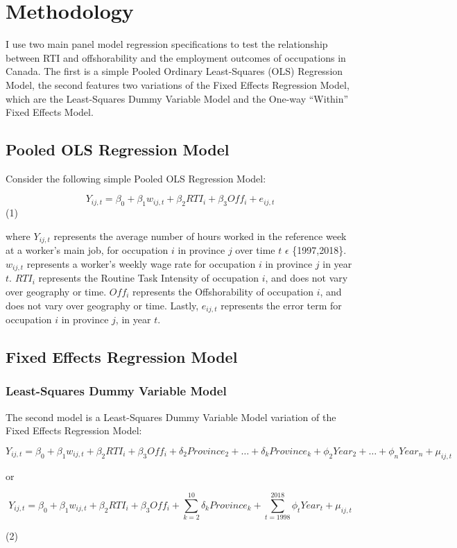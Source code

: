 \documentclass[undefended]{bumrp}
\begin{document}
\chapter{Methodology}

I use two main panel model regression specifications to test the relationship between RTI and offshorability and the employment outcomes of occupations in Canada. The first is a simple Pooled Ordinary Least-Squares (OLS) Regression Model, the second features two variations of the Fixed Effects Regression Model, which are the Least-Squares Dummy Variable Model and the One-way “Within” Fixed Effects Model.

\section{Pooled OLS Regression Model}

Consider the following simple Pooled OLS Regression Model:

\begin{center}
$$ Y_{ij,t} = \beta_{0} + \beta_{1} w_{ij,t} + \beta_{2} RTI_{i} + \beta_{3} Off_{i} + e_{ij,t} $$ (1)
\end{center}

where $Y_{ij,t}$ represents the average number of hours worked in the reference week at a worker’s main job, for occupation $i$ in province $j$ over time $t$ $\epsilon$ \{1997,2018\}.  $w_{ij,t}$ represents a worker’s weekly wage rate for occupation $i$ in province $j$ in year $t$.  $RTI_{i}$ represents the Routine Task Intensity of occupation $i$, and does not vary over geography or time.  $Off_{i}$ represents the Offshorability of occupation $i$, and does not vary over geography or time.  Lastly,  $e_{ij,t}$ represents the error term for occupation $i$ in province $j$,  in year $t$.

\section{Fixed Effects Regression Model}

\subsection{Least-Squares Dummy Variable Model}

The second model is a Least-Squares Dummy Variable Model variation of the Fixed Effects Regression Model:

\begin{center}
$$ Y_{ij,t} = \beta_{0} + \beta_{1} w_{ij,t} + \beta_{2} RTI_{i} + \beta_{3} Off_{i} + \delta_{2} Province_{2} + …  + \delta_{k} Province_{k} +\phi_{2} Year_{2} + …  + \phi_{n} Year_{n} + \mu_{ij,t} $$


or

$$ Y_{ij,t} = \beta_{0} + \beta_{1} w_{ij,t} + \beta_{2} RTI_{i} + \beta_{3} Off_{i} + \sum_{k=2}^{10} \delta_{k} Province_{k} + \sum_{t=1998}^{2018} \phi_{t} Year_{t} + \mu_{ij,t} $$

(2)
\end{center}
\end{document}
